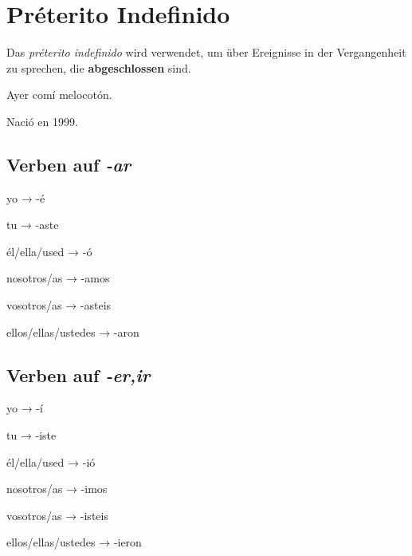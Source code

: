 \section{Pr\'eterito Indefinido}
Das \textit{pr\'eterito indefinido} wird verwendet, um
über Ereignisse in der Vergangenheit zu sprechen, die
\textbf{abgeschlossen} sind.
\begin{ejemplos}
    \item Ayer com\'i melocot\'on.
    \item Naci\'o en 1999.
\end{ejemplos}
\subsection*{Verben auf \textit{-ar}}
\begin{gramatica}
    \item yo → -\'e
    \item tu → -aste
    \item \'el/ella/used → -\'o
    \item nosotros/as → -amos
    \item vosotros/as → -asteis
    \item ellos/ellas/ustedes → -aron
\end{gramatica}
\subsection*{Verben auf \textit{-er,ir}}
\begin{gramatica}
    \item yo → -\'i
    \item tu → -iste
    \item \'el/ella/used → -i\'o
    \item nosotros/as → -imos
    \item vosotros/as → -isteis
    \item ellos/ellas/ustedes → -ieron
\end{gramatica}
